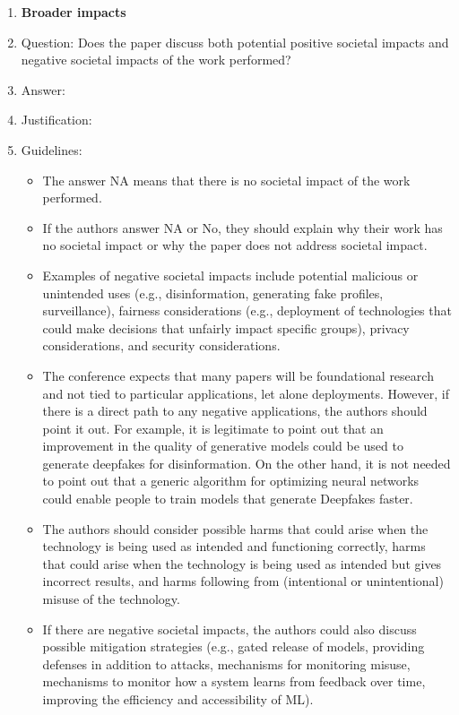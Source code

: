 \documentclass{article}
\begin{document}
\begin{enumerate}
\item {\bf Broader impacts}
    \item[] Question: Does the paper discuss both potential positive societal impacts and negative societal impacts of the work performed?
    \item[] Answer: \answerTODO{} %
    \item[] Justification: \justificationTODO{}
    \item[] Guidelines:
    \begin{itemize}
        \item The answer NA means that there is no societal impact of the work performed.
        \item If the authors answer NA or No, they should explain why their work has no societal impact or why the paper does not address societal impact.
        \item Examples of negative societal impacts include potential malicious or unintended uses (e.g., disinformation, generating fake profiles, surveillance), fairness considerations (e.g., deployment of technologies that could make decisions that unfairly impact specific groups), privacy considerations, and security considerations.
        \item The conference expects that many papers will be foundational research and not tied to particular applications, let alone deployments. However, if there is a direct path to any negative applications, the authors should point it out. For example, it is legitimate to point out that an improvement in the quality of generative models could be used to generate deepfakes for disinformation. On the other hand, it is not needed to point out that a generic algorithm for optimizing neural networks could enable people to train models that generate Deepfakes faster.
        \item The authors should consider possible harms that could arise when the technology is being used as intended and functioning correctly, harms that could arise when the technology is being used as intended but gives incorrect results, and harms following from (intentional or unintentional) misuse of the technology.
        \item If there are negative societal impacts, the authors could also discuss possible mitigation strategies (e.g., gated release of models, providing defenses in addition to attacks, mechanisms for monitoring misuse, mechanisms to monitor how a system learns from feedback over time, improving the efficiency and accessibility of ML).
    \end{itemize}
    

\end{enumerate}
\end{document}
